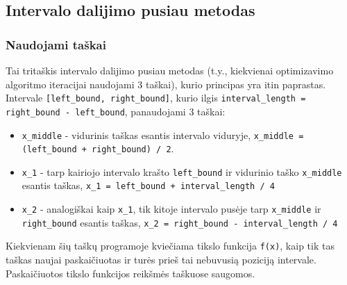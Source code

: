 \documentclass[lithuanian,a4paper,12pt]{article}
\newcommand{\mil}{\texttt}
\begin{document}
\subsection{Intervalo dalijimo pusiau metodas}
\subsubsection*{Naudojami taškai}
Tai tritaškis intervalo dalijimo pusiau metodas (t.y., kiekvienai optimizavimo algoritmo iteracijai naudojami 3 taškai), kurio principas yra itin paprastas. Intervale \mil{[left_bound, right_bound]}, kurio ilgis \mil{interval_length = right_bound - left_bound}, panaudojami 3 taškai:
\begin{itemize}
    \item \mil{x_middle} - vidurinis taškas esantis intervalo viduryje, \mil{x_middle = (left_bound + right_bound) / 2}.
    \item \mil{x_1} - tarp kairiojo intervalo krašto \mil{left_bound} ir vidurinio taško \mil{x_middle} esantis taškas, \mil{x_1 = left_bound + interval_length / 4}
    \item \mil{x_2} - analogiškai kaip \mil{x_1}, tik kitoje intervalo pusėje tarp \mil{x_middle} ir \mil{right_bound} esantis taškas, \mil{x_2 = right_bound - interval_length / 4}
\end{itemize}
Kiekvienam šių taškų programoje kviečiama tikslo funkcija \mil{f(x)}, kaip tik tas taškas naujai paskaičiuotas ir turės prieš tai nebuvusią poziciją intervale. Paskaičiuotos tikslo funkcijos reikšmės taškuose saugomos.

\pagebreak
\end{document}
